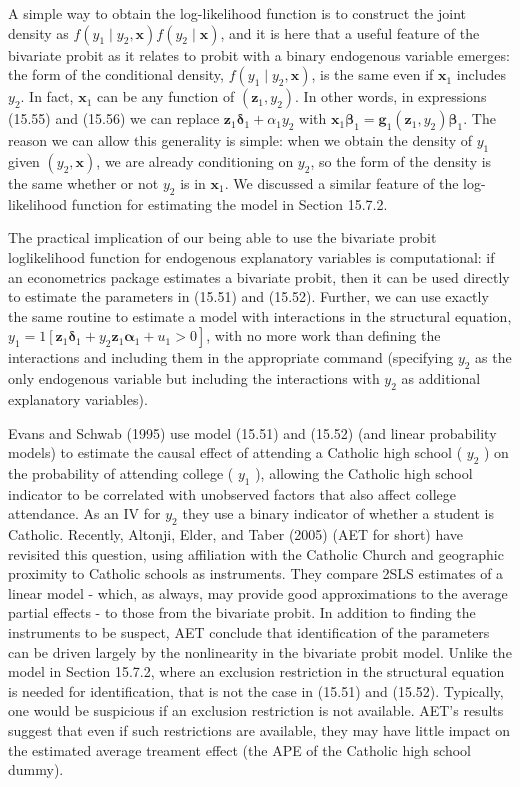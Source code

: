 \documentclass[10pt]{article}
\begin{document}
A simple way to obtain the log-likelihood function is to construct the joint density as $f\left(y_{1} \mid y_{2}, \mathbf{x}\right) f\left(y_{2} \mid \mathbf{x}\right)$, and it is here that a useful feature of the bivariate probit as it relates to probit with a binary endogenous variable emerges: the form of the conditional density, $f\left(y_{1} \mid y_{2}, \mathbf{x}\right)$, is the same even if $\mathbf{x}_{1}$ includes $y_{2}$. In fact, $\mathbf{x}_{1}$ can be any function of $\left(\mathbf{z}_{1}, y_{2}\right)$. In other words, in expressions (15.55) and (15.56) we can replace $\mathbf{z}_{1} \boldsymbol{\delta}_{1}+\alpha_{1} y_{2}$ with $\mathbf{x}_{1} \boldsymbol{\beta}_{1}=\mathbf{g}_{1}\left(\mathbf{z}_{1}, y_{2}\right) \boldsymbol{\beta}_{1}$. The reason we can allow this generality is simple: when we obtain the density of $y_{1}$ given $\left(y_{2}, \mathbf{x}\right)$, we are already conditioning on $y_{2}$, so the form of the density is the same whether or not $y_{2}$ is in $\mathbf{x}_{1}$. We discussed a similar feature of the log-likelihood function for estimating the model in Section 15.7.2.

The practical implication of our being able to use the bivariate probit loglikelihood function for endogenous explanatory variables is computational: if an econometrics package estimates a bivariate probit, then it can be used directly to estimate the parameters in (15.51) and (15.52). Further, we can use exactly the same routine to estimate a model with interactions in the structural equation, $y_{1}=1\left[\mathbf{z}_{1} \boldsymbol{\delta}_{1}+\right. \left.y_{2} \mathbf{z}_{1} \boldsymbol{\alpha}_{1}+u_{1}>0\right]$, with no more work than defining the interactions and including them in the appropriate command (specifying $y_{2}$ as the only endogenous variable but including the interactions with $y_{2}$ as additional explanatory variables).

Evans and Schwab (1995) use model (15.51) and (15.52) (and linear probability models) to estimate the causal effect of attending a Catholic high school ( $y_{2}$ ) on the probability of attending college ( $y_{1}$ ), allowing the Catholic high school indicator to be correlated with unobserved factors that also affect college attendance. As an IV for $y_{2}$ they use a binary indicator of whether a student is Catholic. Recently, Altonji, Elder, and Taber (2005) (AET for short) have revisited this question, using affiliation with the Catholic Church and geographic proximity to Catholic schools as instruments. They compare 2SLS estimates of a linear model - which, as always, may provide good approximations to the average partial effects - to those from the bivariate probit. In addition to finding the instruments to be suspect, AET conclude that identification of the parameters can be driven largely by the nonlinearity in the bivariate probit model. Unlike the model in Section 15.7.2, where an exclusion restriction in the structural equation is needed for identification, that is not the case in (15.51) and (15.52). Typically, one would be suspicious if an exclusion restriction is not available. AET's results suggest that even if such restrictions are available, they may have little impact on the estimated average treament effect (the APE of the Catholic high school dummy).
\end{document}
